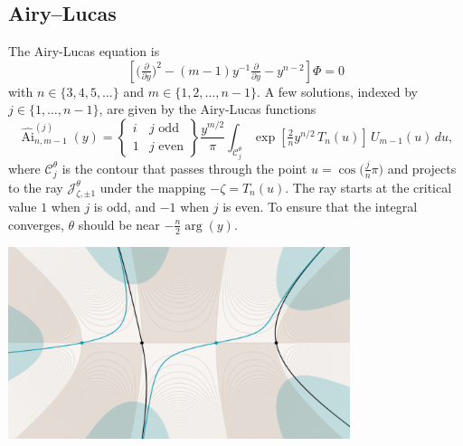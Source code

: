 \documentclass{article}
\DeclareMathOperator{\Ai}{Ai}
\theoremstyle{definition}
\theoremstyle{plain}
\begin{document}
\subsection{Airy--Lucas}\label{example_AL}
The Airy-Lucas equation is
\begin{equation}\label{eqn:airy-lucas}
\left[\big(\tfrac{\partial}{\partial y}\big)^2 - (m-1) y^{-1} \tfrac{\partial}{\partial y} - y^{n-2}\right] \Phi = 0
\end{equation}
with $n \in \{3, 4, 5, \ldots\}$ and $m \in \{1, 2, \ldots, n-1\}$. A few solutions, indexed by $j \in \{1, \ldots, n-1\}$, are given by the Airy-Lucas functions~\cite[equation~3.6]{charbonnier22}
\begin{equation}\label{integral:AL}
\widehat{\Ai}^{(j)}_{n, m-1}(y) = \left\{\begin{array}{ll}i & j \text{ odd} \\ 1 & j \text{ even}\end{array}\right\} \frac{y^{m/2}}{\pi} \int_{\mathcal{C}^\theta_j} \exp\left[\tfrac{2}{n} y^{n/2}\,T_n(u)\right]\,U_{m-1}(u)\,du,
\end{equation}
where $\mathcal{C}^\theta_j$ is the contour that passes through the point $u = \cos\big(\tfrac{j}{n}\pi\big)$ and projects to the ray $\mathcal{J}^\theta_{\zeta, \pm 1}$ under the mapping $-\zeta = T_n(u)$. The ray starts at the critical value $1$ when $j$ is odd, and $-1$ when $j$ is even. To ensure that the integral converges, $\theta$ should be near $-\tfrac{n}{2} \arg(y)$.
\begin{center}
\includegraphics[width=10cm]{figures/thimbles-n5.png}
\label{fig:thimble_n_5}
\end{center}
\end{document}
